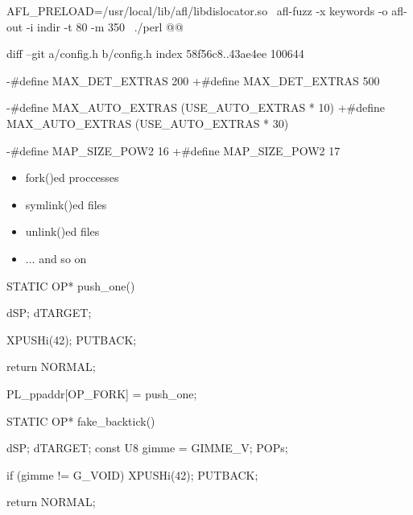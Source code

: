 \documentclass[mathserif,hyperref={urlcolor=cyan,colorlinks=true}]{beamer}
\begin{document}
{{\begin{frame}[fragile]
\begin{bashcode}
\end{bashcode}
\pause
\begin{bashcode}

AFL_PRELOAD=/usr/local/lib/afl/libdislocator.so \
afl-fuzz -x keywords -o afl-out -i indir -t 80 -m 350 \
./perl @@
\end{bashcode}
\end{frame}

\begin{frame}[fragile]
\begin{diffcode}
diff --git a/config.h b/config.h
index 58f56c8..43ae4ee 100644

-#define MAX_DET_EXTRAS      200
+#define MAX_DET_EXTRAS      500

-#define MAX_AUTO_EXTRAS     (USE_AUTO_EXTRAS * 10)
+#define MAX_AUTO_EXTRAS     (USE_AUTO_EXTRAS * 30)

-#define MAP_SIZE_POW2       16
+#define MAP_SIZE_POW2       17
\end{diffcode}
\end{frame}

\begin{frame}
\end{frame}

\begin{frame}
\begin{itemize}
\item fork()ed proccesses
\item symlink()ed files
\item unlink()ed files
\pause
\item ... and so on
\end{itemize}
\end{frame}


\begin{frame}[fragile]
\begin{ccode}
STATIC OP*
push_one() {
    dSP; dTARGET;

    XPUSHi(42);
    PUTBACK;

    return NORMAL;
}

PL_ppaddr[OP_FORK] = push_one;
\end{ccode}

\pause

\begin{ccode}
STATIC OP*
fake_backtick() {
    dSP; dTARGET;
    const U8 gimme = GIMME_V;
    POPs;

    if (gimme != G_VOID) {
        XPUSHi(42);
        PUTBACK;
    }

    return NORMAL;
}


\end{ccode}
\end{frame}}}
\end{document}
